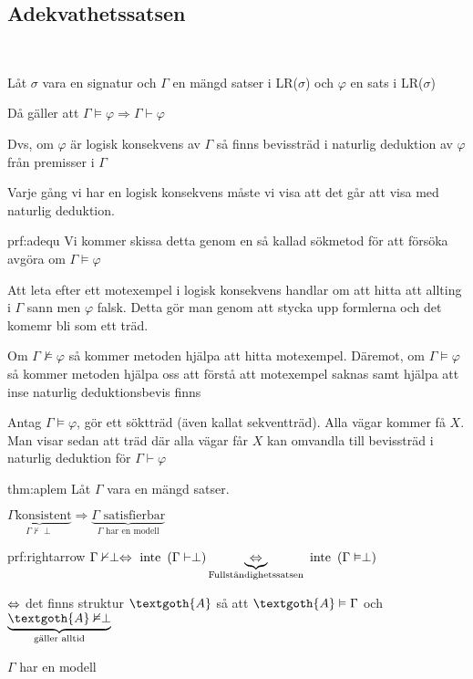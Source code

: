 \subsection{Adekvathetssatsen}\hfill\\\par
\noindent Låt $\sigma$ vara en signatur och $\Gamma$ en mängd satser i LR($\sigma$) och $\varphi$ en sats i LR($\sigma$)\par
\noindent Då gäller att $\Gamma\vDash\varphi\Rightarrow\Gamma\vdash\varphi$\par
\noindent Dvs, om $\varphi$ är logisk konsekvens av $\Gamma$ så finns bevissträd i naturlig deduktion av $\varphi$ från premisser i $\Gamma$
\par\bigskip
\noindent Varje gång vi har en logisk konsekvens måste vi visa att det går att visa med naturlig deduktion.
\par\bigskip
\begin{prf}[Adekvathetssatsen]{prf:adequ}
  \noindent Vi kommer skissa detta genom en så kallad sökmetod för att försöka avgöra om $\Gamma\vDash\varphi$\par
  \noindent Att leta efter ett motexempel i logisk konsekvens handlar om att hitta att allting i $\Gamma$ sann men $\varphi$ falsk. Detta gör man genom att stycka upp formlerna och det komemr bli som ett träd. \par\bigskip
  \noindent Om $\Gamma\nvDash\varphi$ så kommer metoden hjälpa att hitta motexempel. Däremot, om $\Gamma\vDash\varphi$ så kommer metoden hjälpa oss att förstå att motexempel saknas samt hjälpa att inse naturlig deduktionsbevis finns\par\bigskip
  \noindent Antag $\Gamma\vDash\varphi$, gör ett söktträd (även kallat sekventträd). Alla vägar kommer få $X$. Man visar sedan att träd där alla vägar får $X$ kan omvandla till bevissträd i naturlig deduktion för $\Gamma\vdash\varphi$ 
\end{prf}
\par\bigskip
\begin{theo}{thm:aplem}
  \noindent Låt $\Gamma$ vara en mängd satser.\par
  \noindent $\underbrace{\Gamma \text{konsistent}}_{\text{$\Gamma\nvdash\perp$}}\Rightarrow\underbrace{\Gamma\text{ satisfierbar}}_{\text{$\Gamma$ har en modell}}$
\end{theo}
\newpage
\begin{prf}[$\Rightarrow$]{prf:rightarrow}
  $\Gamma\nvdash\perp\Leftrightarrow\text{ inte }\left(\Gamma\vdash\perp\right)\underbrace{\Leftrightarrow}_{\text{Fullständighetssatsen}}\text{ inte }\left(\Gamma\vDash\perp\right)$
  \par\bigskip

  \noindent$\Leftrightarrow$ det finns struktur $\textgoth{A}$ så att $\textgoth{A}\vDash\Gamma$ och $\underbrace{\textgoth{A}\nvDash\perp}_{\text{gäller alltid}}$
  \par\bigskip
  \noindent$\Gamma$ har en modell
\end{prf}

